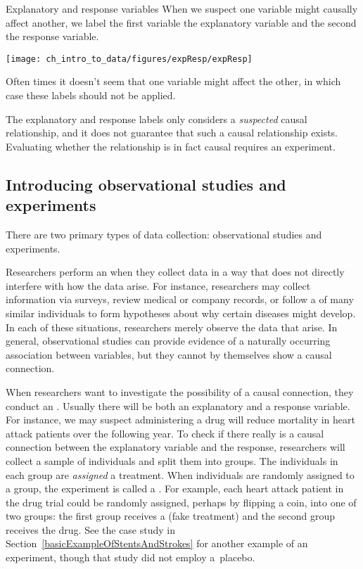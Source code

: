 \begin{onebox}{Explanatory and response variables}
When we suspect one variable might causally affect another,
we label the first variable the explanatory variable and the
second the response variable.
\vspace{1mm}

\hspace{10mm}\texttt{[image: ch\_intro\_to\_data/figures/expResp/expResp]}

Often times it doesn't seem that one variable might affect the other,
in which case these labels should not be applied.
\end{onebox}

The explanatory and response labels only considers
a \emph{suspected} causal relationship, and it does not guarantee
that such a causal relationship exists.
Evaluating whether the relationship is in fact causal
requires an experiment.


\subsection{Introducing observational studies and experiments}

\noindent%
There are two primary types of data collection:
observational studies and experiments.

Researchers perform an  when they
collect data in a way that does not directly interfere with
how the data arise.
For instance, researchers may collect information via surveys,
review medical or company records, or follow a 
of many similar individuals to form hypotheses about why certain
diseases might develop.
In each of these situations, researchers merely observe the
data that arise.
In general, observational studies can provide evidence of
a naturally occurring association between variables, but they
cannot by themselves show a causal connection.

When researchers want to investigate the possibility of
a causal connection, they conduct an .
Usually there will be both an explanatory and a response
variable.
For instance, we may suspect administering a drug will reduce
mortality in heart attack patients over the following year.
To check if there really is a causal connection between the
explanatory variable and the response, researchers will collect
a sample of individuals and split them into groups.
The individuals in each group are \emph{assigned} a treatment.
When individuals are randomly assigned to a group,
the experiment is called a .
For example, each heart attack patient in the drug trial
could be randomly assigned,  perhaps by flipping a coin,
into one of two groups:
the first group receives a  (fake treatment)
and the second group receives the drug.
See the case study in
Section~\ref{basicExampleOfStentsAndStrokes} for another
example of an experiment, though that study did not employ
a~placebo.

